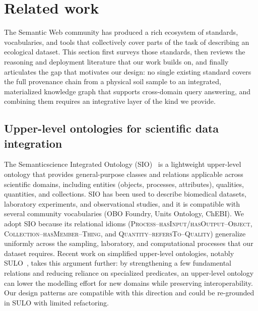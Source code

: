 \documentclass[11pt,a4paper]{article}
\begin{document}
\section{Related work}\label{sec:related}

The Semantic Web community has produced a rich ecosystem of
standards, vocabularies, and tools that collectively cover parts of
the task of describing an ecological dataset. This section first
surveys those standards, then reviews the reasoning and deployment
literature that our work builds on, and finally articulates the gap
that motivates our design: no single existing standard covers the
full provenance chain from a physical soil sample to an integrated,
materialized knowledge graph that supports cross-domain query
answering, and combining them requires an integrative layer of the
kind we provide.

\subsection{Upper-level ontologies for scientific data integration}

The Semanticscience Integrated Ontology (SIO)~\cite{sio} is a
lightweight upper-level ontology that provides general-purpose classes
and relations applicable across scientific domains, including entities
(objects, processes, attributes), qualities, quantities, and
collections. SIO has been used to describe biomedical datasets,
laboratory experiments, and observational studies, and it is
compatible with several community vocabularies (OBO Foundry,
Units Ontology, ChEBI). We adopt SIO because its relational idioms
(\textsc{Process--hasInput/hasOutput--Object},
\textsc{Collection--hasMember--Thing}, and
\textsc{Quantity--refersTo--Quality}) generalize uniformly across the
sampling, laboratory, and computational processes that our dataset
requires. Recent work on simplified upper-level ontologies, notably
SULO~\cite{sulo2025}, takes this argument further: by strengthening a
few fundamental relations and reducing reliance on specialized
predicates, an upper-level ontology can lower the modelling effort
for new domains while preserving interoperability. Our design
patterns are compatible with this direction and could be re-grounded
in SULO with limited refactoring.
\end{document}
